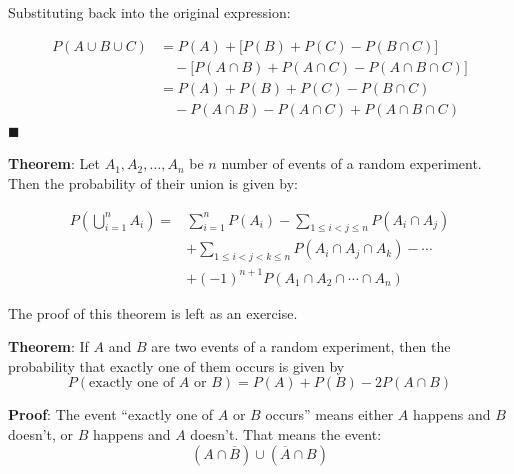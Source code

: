 \documentclass[twoside]{book}
\begin{document}
Substituting back into the original expression:

\begin{align*}
P(A \cup B \cup C) &= P(A) + \big[ P(B) + P(C) - P(B \cap C) \big] \\
&\quad - \big[ P(A \cap B) + P(A \cap C) - P(A \cap B \cap C) \big] \\
&= P(A) + P(B) + P(C) - P(B \cap C) \\
&\quad - P(A \cap B) - P(A \cap C) + P(A \cap B \cap C)
\end{align*}
\hfill\(\blacksquare\)

\begin{textbox}
\textbf{Theorem}: Let \( A_1, A_2, \ldots, A_n \) be $n$ number of events of a random experiment. Then the probability of their union is given by:

\begin{align*}
P\left( \bigcup_{i=1}^n A_i \right)
= &\sum_{i=1}^{n} P(A_i)
- \sum_{1 \le i < j \le n} P(A_i \cap A_j) \\
&+ \sum_{1 \le i < j < k \le n} P(A_i \cap A_j \cap A_k)
- \cdots \\
&+ (-1)^{n+1} P(A_1 \cap A_2 \cap \cdots \cap A_n)
\end{align*}

\end{textbox}
The proof of this theorem is left as an exercise.

\begin{textbox}
    \textbf{Theorem}: If $A$ and $B$ are two events of a random experiment, then the probability that exactly one of them occurs is given by
    $$P(\text{exactly one of } A \text{ or } B) = P(A) + P(B) - 2P(A \cap B)$$
\end{textbox}
\textbf{Proof}: The event ``exactly one of $A$ or $B$ occurs'' means either $A$ happens and $B$ doesn't, or $B$  happens and $A$ doesn't. That means the event:
\[
(A \cap \overline{B}) \cup (\overline{A} \cap B)
\]



\end{document}
